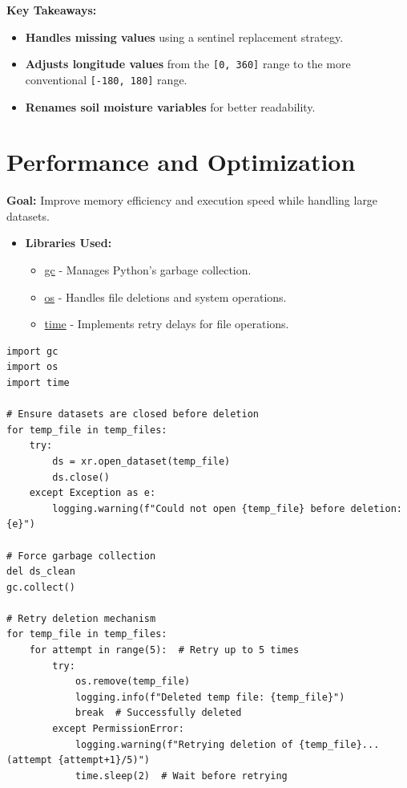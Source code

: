 \documentclass[a4paper,10pt]{article}
\begin{document}
\textbf{Key Takeaways:}
\begin{itemize}
    \item \textbf{Handles missing values} using a sentinel replacement strategy.
    \item \textbf{Adjusts longitude values} from the \texttt{[0, 360]} range to the more conventional \texttt{[-180, 180]} range.
    \item \textbf{Renames soil moisture variables} for better readability.
\end{itemize}

\section{Performance and Optimization}
\textbf{Goal:} Improve memory efficiency and execution speed while handling large datasets.

\begin{itemize}
    \item \textbf{Libraries Used:}
    \begin{itemize}
        \item \href{https://docs.python.org/3/library/gc.html}{gc} - Manages Python's garbage collection.
        \item \href{https://docs.python.org/3/library/os.html}{os} - Handles file deletions and system operations.
        \item \href{https://docs.python.org/3/library/time.html}{time} - Implements retry delays for file operations.
    \end{itemize}
\end{itemize}

\begin{verbatim}
import gc
import os
import time

# Ensure datasets are closed before deletion
for temp_file in temp_files:
    try:
        ds = xr.open_dataset(temp_file)
        ds.close()
    except Exception as e:
        logging.warning(f"Could not open {temp_file} before deletion: {e}")

# Force garbage collection
del ds_clean
gc.collect()

# Retry deletion mechanism
for temp_file in temp_files:
    for attempt in range(5):  # Retry up to 5 times
        try:
            os.remove(temp_file)
            logging.info(f"Deleted temp file: {temp_file}")
            break  # Successfully deleted
        except PermissionError:
            logging.warning(f"Retrying deletion of {temp_file}... (attempt {attempt+1}/5)")
            time.sleep(2)  # Wait before retrying
\end{verbatim}
\end{document}
